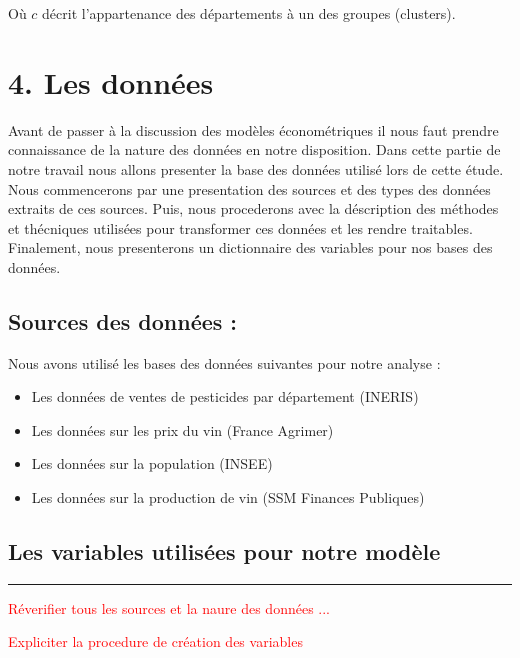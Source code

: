 \documentclass[11pt,]{article}
\providecommand{\tightlist}{%
  \setlength{\itemsep}{0pt}\setlength{\parskip}{0pt}}
\begin{document}
Où \(c\) décrit l'appartenance des départements à un des groupes
(clusters).

\hypertarget{les-donnees}{%
\section{4. Les données}\label{les-donnees}}

Avant de passer à la discussion des modèles économétriques il nous faut
prendre connaissance de la nature des données en notre disposition. Dans
cette partie de notre travail nous allons presenter la base des données
utilisé lors de cette étude. Nous commencerons par une presentation des
sources et des types des données extraits de ces sources. Puis, nous
procederons avec la déscription des méthodes et thécniques utilisées
pour transformer ces données et les rendre traitables. Finalement, nous
presenterons un dictionnaire des variables pour nos bases des données.

\hypertarget{sources-des-donnees}{%
\subsection{Sources des données :}\label{sources-des-donnees}}

Nous avons utilisé les bases des données suivantes pour notre analyse :

\begin{itemize}
\tightlist
\item
  Les données de ventes de pesticides par département (INERIS)
\item
  Les données sur les prix du vin (France Agrimer)
\item
  Les données sur la population (INSEE)
\item
  Les données sur la production de vin (SSM Finances Publiques)
\end{itemize}

\hypertarget{les-variables-utilisees-pour-notre-modele}{%
\subsection{Les variables utilisées pour notre
modèle}\label{les-variables-utilisees-pour-notre-modele}}

\noindent

\rule[0.5ex]{\linewidth}{1pt}

\textcolor{red}{Réverifier tous les sources et la naure des données ...}

\textcolor{red}{Expliciter la procedure de création des variables}
\end{document}
